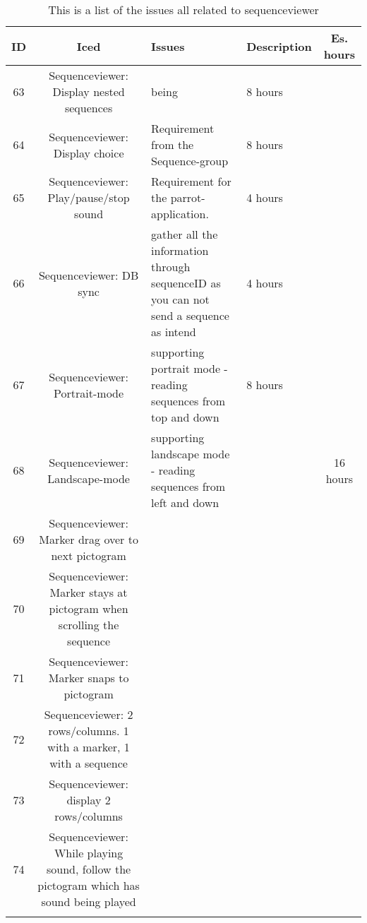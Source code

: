 \begin{longtable} { | c | c | p{5cm} | p{5cm} | c | } 
\hline
	ID 	&	Iced	&	Issues	&	Description		&	 Es. hours \\\hline
	63	& 	Sequenceviewer: Display nested sequences	&	being		& 	8 hours \\\hline
	64	&   	Sequenceviewer: Display choice	&	Requirement from the Sequence-group	& 	8 hours  \\\hline
	65	& 	Sequenceviewer: Play/pause/stop sound	&	Requirement for the parrot-application.	& 	4 hours  \\\hline
	66	& 	Sequenceviewer: DB sync	&	gather all the information through sequenceID as you can not send a sequence as intend			 &  4 hours \\\hline
	67	& 	Sequenceviewer: Portrait-mode	&	supporting portrait mode - reading sequences from top and down	 &  8 hours \\\hline
	68	& 	Sequenceviewer: Landscape-mode	&	supporting landscape mode - reading sequences from left and down		& 		 &  16 hours \\\hline
	69	& 	Sequenceviewer: Marker drag over to next pictogram	&			& 		 &  \\\hline
	70	& 	Sequenceviewer: Marker stays at pictogram when scrolling the sequence	&			& 		 &  \\\hline
	71	& 	Sequenceviewer: Marker snaps to pictogram		&			& 		 &  \\\hline
	72	& 	Sequenceviewer: 2 rows/columns. 1 with a marker, 1 with a sequence	&			& 		 &  \\\hline
	73	& 	Sequenceviewer: display 2 rows/columns	&			& 		 &  \\\hline
	74	& 	Sequenceviewer: While playing sound, follow the pictogram which has sound being played	&			& 		 &  \\\hline
\caption{This is a list of the issues all related to sequenceviewer}
\label{tab:spr3_sw_prodblog}
\end{longtable}

